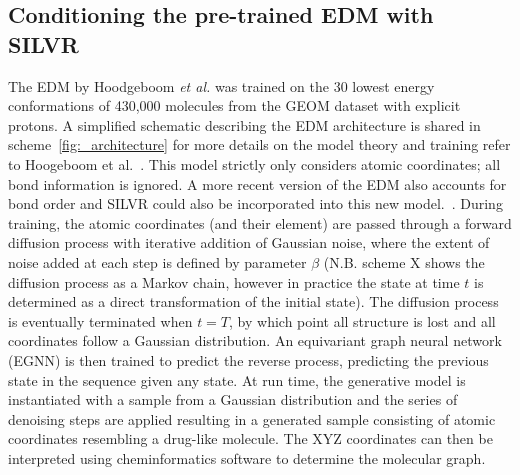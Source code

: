 \documentclass[journal=jacsat,manuscript=article]{achemso}
\begin{document}
\subsection{Conditioning the pre-trained EDM with SILVR}
The EDM by Hoodgeboom \textit{et al.} was trained on the 30 lowest energy conformations of 430,000 molecules from the GEOM dataset with explicit protons. A simplified schematic describing the EDM architecture is shared in scheme~\ref{fig:_architecture} for more details on the model theory and training refer to Hoogeboom et al.~\cite{hoogeboom2022equivariant}. This model strictly only considers atomic coordinates; all bond information is ignored. A more recent version of the EDM also accounts for bond order and SILVR could also be incorporated into this new model.~\cite{hvignac2023midi}. During training, the atomic coordinates (and their element) are passed through a forward diffusion process with iterative addition of Gaussian noise, where the extent of noise added at each step is defined by parameter $\beta$ (N.B. scheme X shows the diffusion process as a Markov chain, however in practice the state at time $t$ is determined as a direct transformation of the initial state). The diffusion process is eventually terminated when $t=T$, by which point all structure is lost and all coordinates follow a Gaussian distribution. An equivariant graph neural network (EGNN) is then trained to predict the reverse process, predicting the previous state in the sequence given any state. At run time, the generative model is instantiated with a sample from a Gaussian distribution and the series of denoising steps are applied resulting in a generated sample consisting of atomic coordinates resembling a drug-like molecule. The XYZ coordinates can then be interpreted using cheminformatics software to determine the molecular graph. 
\end{document}
